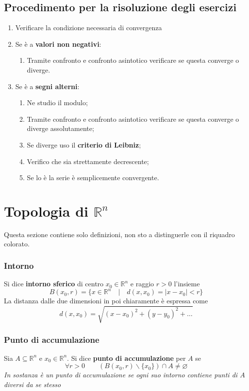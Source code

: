 \documentclass[x11names]{article}
\begin{document}
	
	\begin{es}{}
		\subsection{Procedimento per la risoluzione degli esercizi}
		\begin{enumerate}
			\item Verificare la condizione necessaria di convergenza
			\item Se è a \textbf{valori non negativi}: 
			\begin{enumerate}
				\item Tramite confronto e confronto asintotico verificare se questa converge o diverge.
			\end{enumerate}
			\item Se è a \textbf{segni alterni}:
			\begin{enumerate}
				\item Ne studio il modulo;
				\item Tramite confronto e confronto asintotico verificare se questa converge o diverge assolutamente;
				\item Se diverge uso il \textbf{criterio di Leibniz};
				\item Verifico che sia strettamente decrescente;
				\item Se lo è la serie è semplicemente convergente.
			\end{enumerate}
		\end{enumerate}
	\end{es}
	
	\newpage
	\section{Topologia di \(\mathbb{R}^n\)}
	Questa sezione contiene solo definizioni, non sto a distinguerle con il riquadro colorato.
	
	\subsubsection*{Intorno}
	Si dice \textbf{intorno sferico} di centro \(x_{0} \in \mathbb{R}^n\) e raggio \(r>0\) l'insieme
	\[ 
	B(x_{0},r) = \{x \in \mathbb{R}^n \quad |\quad d(x,x_{0}) = |x-x_{0}| < r\}
	\]
	La distanza dalle due dimensioni in poi chiaramente è espressa come
	\[ 
	d(x,x_{0}) = \sqrt{(x-x_{0})^2 + (y-y_{0})^2 + \dots }
	\]
	
	
	\subsubsection*{Punto di accumulazione}
	Sia \(A \subseteq \mathbb{R}^n\) e \(x_{0} \in \mathbb{R}^n\). Si dice \textbf{punto di accumulazione} per \(A\) se
	\[ 
	\forall r > 0 \qquad \left(B(x_{0},r) \smallsetminus \{x_{0}\} \right) \cap A \neq \varnothing
	\]
	\textit{In sostanza è un punto di accumulazione se ogni suo intorno contiene punti di \(A\) diversi da se stesso}
\end{document}
